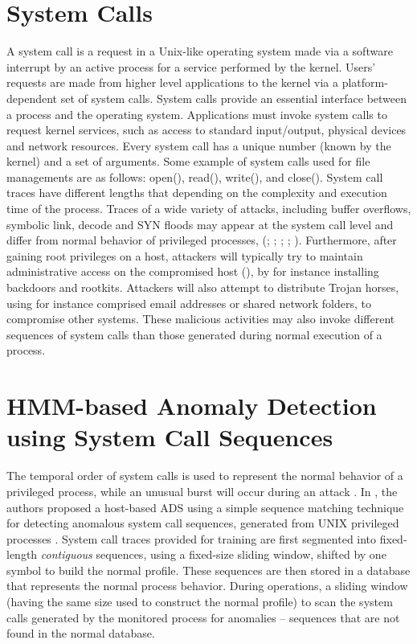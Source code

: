 \section{System Calls}
\label{sec:system-calls}
A system call is a request in a Unix-like operating system made via a software interrupt by an active process for a service performed by the kernel.
Users' requests are made from higher level applications  to the kernel via a platform-dependent set of system calls. System calls provide an essential interface between a process and the operating system. Applications must invoke system calls to request kernel services, such as access to standard input/output, physical devices and network resources. Every system call has a unique number (known by the kernel) and a set of arguments. Some example of system calls used for file managements are as follows: open(), read(), write(), and close(). System call traces have different lengths that depending on the complexity and execution time of the process.
Traces of a wide variety of attacks, including buffer overflows, symbolic link, decode and SYN floods may appear at the system call level and differ from normal behavior of privileged processes, (\cite{Forrest1996}; \cite{Hofmeyr1998}; \cite{Kosoresow1997}; \cite{Somaayaji2002}; \cite{Warrender1999}). Furthermore, after gaining root privileges on a host, attackers will typically try to maintain administrative access on the compromised host (\cite{Mitnick2005}), by for instance installing backdoors and rootkits. Attackers will also attempt to distribute Trojan horses, using for instance comprised email addresses or shared network folders, to compromise other systems. These malicious activities may also invoke different sequences of system calls than those generated during normal execution of a process.

\section{HMM-based Anomaly Detection using System Call Sequences}
\label{sec:ads-hmm}


The temporal order of system calls is used to represent the normal behavior of a privileged process, while an unusual burst will occur during an attack \cite{Forrest1996,Warrender1999}.
In \cite{Forrest1996,Warrender1999}, the authors proposed a host-based ADS using a simple sequence matching technique for detecting anomalous system call sequences, generated from UNIX privileged processes \cite{Forrest1996}.
System call traces provided for training are first segmented into fixed-length \textit{contiguous} sequences, using a fixed-size sliding window, shifted by one symbol to build the normal profile.
These sequences are then stored in a database that represents the normal process behavior.
During operations, a sliding window (having the same size used to construct the normal profile) to scan the system calls generated by the monitored process for anomalies -- sequences that are not found in the normal database.


